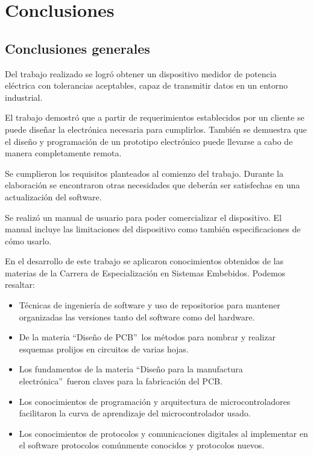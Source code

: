 
\chapter{Conclusiones} %

\label{Chapter5} %




\section{Conclusiones generales }
Del trabajo realizado se logró obtener un dispositivo medidor de potencia eléctrica con tolerancias aceptables, capaz de transmitir datos en un entorno industrial.

El trabajo demostró que a partir de requerimientos establecidos por un cliente se puede diseñar la electrónica necesaria para cumplirlos. También se demuestra que el diseño y programación de un prototipo electrónico puede llevarse a cabo de manera completamente remota.

Se cumplieron los requisitos planteados al comienzo del trabajo. Durante la elaboración se encontraron otras necesidades que deberán ser satisfechas en una actualización del software.

Se realizó un manual de usuario para poder comercializar el dispositivo. El manual incluye las limitaciones del dispositivo como también especificaciones de cómo usarlo.

En el desarrollo de este trabajo se aplicaron conocimientos obtenidos de las materias de la Carrera de Especialización en Sistemas Embebidos. Podemos resaltar:

\begin{itemize}
\item Técnicas de ingeniería de software y uso de repositorios para mantener organizadas las versiones tanto del software como del hardware.
\item De la materia \textquotedblleft Diseño de PCB\textquotedblright \  los métodos para nombrar y realizar esquemas prolijos en circuitos de varias hojas.
\item Los fundamentos de la materia \textquotedblleft Diseño para la manufactura electrónica\textquotedblright \  fueron claves para la fabricación del PCB.
\item Los conocimientos de programación y arquitectura de microcontroladores facilitaron la curva de aprendizaje del microcontrolador usado.
\item Los conocimientos de protocolos y comunicaciones digitales al implementar en el software protocolos comúnmente conocidos y protocolos nuevos.
\end{itemize}

